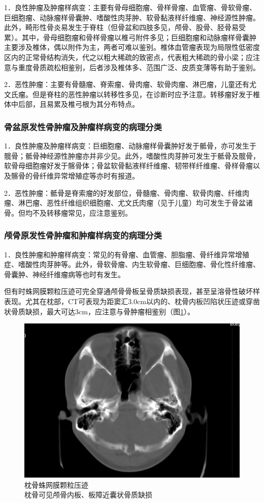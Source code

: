 1．良性肿瘤及肿瘤样病变：主要有骨母细胞瘤、骨样骨瘤、血管瘤、骨软骨瘤、巨细胞瘤、动脉瘤样骨囊肿、嗜酸性肉芽肿、软骨黏液样纤维瘤、神经源性肿瘤。此外，畸形性骨炎易发生于脊柱（但骨盆和四肢多见，颅骨、股骨、胫骨易受累）。其中，骨母细胞瘤和骨样骨瘤以椎弓附件多见；巨细胞瘤和动脉瘤样骨囊肿主要涉及椎体，偶以附件为主，两者可难以鉴别。椎体血管瘤表现为局限性低密度区内的正常骨结构消失，代之以粗大稀疏的致密点，代表粗大稀疏的骨小梁；应注意与重度骨质疏松相鉴别，后者涉及椎体多、范围广泛、皮质变薄等有助于鉴别。

2．恶性肿瘤：主要有骨髓瘤、脊索瘤、骨肉瘤、软骨肉瘤、淋巴瘤，儿童还有尤文氏瘤。但是脊柱的恶性肿瘤以转移性多见，在诊断时应予注意。转移瘤好发于椎体中后部，且易累及椎弓根为其分布特点。

\subsubsection{骨盆原发性骨肿瘤及肿瘤样病变的病理分类}

1．良性肿瘤及肿瘤样病变：巨细胞瘤、动脉瘤样骨囊肿好发于骶骨，亦可发生于髋骨；骶骨神经源性肿瘤亦并非少见。此外，嗜酸性肉芽肿可发生于骶骨及髋骨，软骨母细胞瘤好发于髂骨体；骨盆软骨黏液样纤维瘤、韧带样纤维瘤、骨样骨瘤以及髂骨的骨纤维异常增殖症等亦时有报道。

2．恶性肿瘤：骶骨是脊索瘤的好发部位，骨髓瘤、骨肉瘤、软骨肉瘤、纤维肉瘤、淋巴瘤、恶性纤维组织细胞瘤、尤文氏肉瘤（见于儿童）均可发生于骨盆诸骨。但均不及转移瘤常见，应注意鉴别。

\subsubsection{颅骨原发性骨肿瘤和肿瘤样病变的病理分类}

1．良性肿瘤和肿瘤样病变：常见的有骨瘤、血管瘤、胆脂瘤、骨纤维异常增殖症、嗜酸性肉芽肿等。此外，骨软骨瘤、内生软骨瘤、巨细胞瘤、骨化性纤维瘤、骨囊肿、神经纤维瘤病等也时有发生。

但有时蛛网膜颗粒压迹可完全穿通颅骨骨板呈骨质缺损表现，甚至呈溶骨性破坏样表现。尤其在枕部，CT可表现为距窦汇3.0cm以内的、枕骨内板凹陷状压迹或穿凿状骨质缺损，最大可达3cm，应注意与骨肿瘤相鉴别（图\ref{fig22-23}）。

\begin{figure}[!htbp]
 \centering
 \includegraphics[width=.7\textwidth,height=\textheight,keepaspectratio]{./images/Image00448.jpg}
 \captionsetup{justification=centering}
 \caption{枕骨蛛网膜颗粒压迹\\{\small 枕骨可见颅骨内板、板障近囊状骨质缺损}}
 \label{fig22-23}
  \end{figure} 

